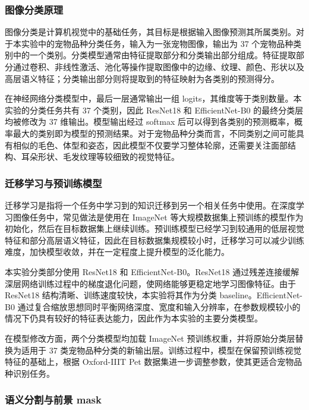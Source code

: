 \documentclass[UTF8,a4paper,12pt]{ctexart}
\begin{document}
\subsubsection{图像分类原理}
\label{sec:principle-classification}

图像分类是计算机视觉中的基础任务，其目标是根据输入图像预测其所属类别。对于本实验中的宠物品种分类任务，输入为一张宠物图像，输出为 37 个宠物品种类别中的一个类别。分类模型通常由特征提取部分和分类输出部分组成。特征提取部分通过卷积、非线性激活、池化等操作提取图像中的边缘、纹理、颜色、形状以及高层语义特征；分类输出部分则将提取到的特征映射为各类别的预测得分。

在神经网络分类模型中，最后一层通常输出一组 logits，其维度等于类别数量。本实验的分类任务共有 37 个类别，因此 ResNet18 和 EfficientNet-B0 的最终分类层均被修改为 37 维输出。模型输出经过 softmax 后可以得到各类别的预测概率，概率最大的类别即为模型的预测结果。对于宠物品种分类而言，不同类别之间可能具有相似的毛色、体型和姿态，因此模型不仅要学习整体轮廓，还需要关注面部结构、耳朵形状、毛发纹理等较细致的视觉特征。

\subsubsection{迁移学习与预训练模型}
\label{sec:principle-transfer-learning}

迁移学习是指将一个任务中学习到的知识迁移到另一个相关任务中使用。在深度学习图像任务中，常见做法是使用在 ImageNet 等大规模数据集上预训练的模型作为初始化，然后在目标数据集上继续训练。预训练模型已经学习到较通用的低层视觉特征和部分高层语义特征，因此在目标数据集规模较小时，迁移学习可以减少训练难度，加快模型收敛，并在一定程度上提升模型的泛化能力。

本实验分类部分使用 ResNet18 和 EfficientNet-B0。ResNet18 通过残差连接缓解深层网络训练过程中的梯度退化问题，使网络能够更稳定地学习图像特征。由于 ResNet18 结构清晰、训练速度较快，本实验将其作为分类 baseline。EfficientNet-B0 通过复合缩放思想同时平衡网络深度、宽度和输入分辨率，在参数规模较小的情况下仍具有较好的特征表达能力，因此作为本实验的主要分类模型。

在模型修改方面，两个分类模型均加载 ImageNet 预训练权重，并将原始分类层替换为适用于 37 类宠物品种分类的新输出层。训练过程中，模型在保留预训练视觉特征的基础上，根据 Oxford-IIIT Pet 数据集进一步调整参数，使其更适合宠物品种识别任务。

\subsubsection{语义分割与前景 mask}
\label{sec:principle-segmentation}
\end{document}
